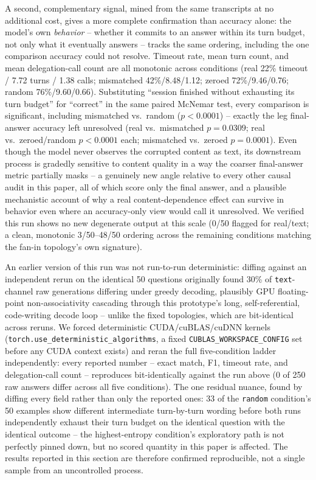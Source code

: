 \documentclass[11pt]{article}
\begin{document}
A second, complementary signal, mined from the same transcripts at no
additional cost, gives a more complete confirmation than accuracy alone:
the model's own \emph{behavior} -- whether it commits to an answer within
its turn budget, not only what it eventually answers -- tracks the same
ordering, including the one comparison accuracy could not resolve.
Timeout rate, mean turn count, and mean delegation-call count are all
monotonic across conditions (real 22\% timeout / 7.72 turns / 1.38 calls;
mismatched 42\%/8.48/1.12; zeroed 72\%/9.46/0.76; random 76\%/9.60/0.66).
Substituting ``session finished without exhausting its turn budget'' for
``correct'' in the same paired McNemar test, every comparison is
significant, including mismatched vs.\ random ($p<0.0001$) -- exactly
the leg final-answer accuracy left unresolved (real vs.\ mismatched
$p=0.0309$; real vs.\ zeroed/random $p<0.0001$ each; mismatched vs.\
zeroed $p=0.0001$). Even though the model never observes the corrupted
content as text, its downstream process is gradedly sensitive to content
quality in a way the coarser final-answer metric partially masks --
a genuinely new angle relative to every other causal audit in this
paper, all of which score only the final answer, and a plausible
mechanistic account of why a real content-dependence effect can survive
in behavior even where an accuracy-only view would call it unresolved.
We verified this run shows no new degenerate output at this scale (0/50
flagged for real/text; a clean, monotonic 3/50--48/50 ordering across the
remaining conditions matching the fan-in topology's own signature).

An earlier version of this run was not run-to-run deterministic: diffing
against an independent rerun on the identical 50 questions originally
found 30\% of \texttt{text}-channel raw generations differing under
greedy decoding, plausibly GPU floating-point non-associativity
cascading through this prototype's long, self-referential, code-writing
decode loop -- unlike the fixed topologies, which are bit-identical
across reruns. We forced deterministic CUDA/cuBLAS/cuDNN kernels
(\texttt{torch.use\_deterministic\_algorithms}, a fixed
\texttt{CUBLAS\_WORKSPACE\_CONFIG} set before any CUDA context exists)
and reran the full five-condition ladder independently: every reported
number -- exact match, F1, timeout rate, and delegation-call count --
reproduces bit-identically against the run above (0 of 250 raw answers
differ across all five conditions). The one residual nuance, found by
diffing every field rather than only the reported ones: 33 of the
\texttt{random} condition's 50 examples show different intermediate
turn-by-turn wording before both runs independently exhaust their turn
budget on the identical question with the identical outcome -- the
highest-entropy condition's exploratory path is not perfectly pinned
down, but no scored quantity in this paper is affected. The results
reported in this section are therefore confirmed reproducible, not a
single sample from an uncontrolled process.
\end{document}
